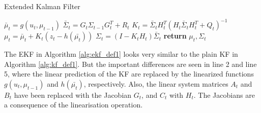 \begin{center}
\begin{minipage}{.65\linewidth}
\begin{algorithm}[H]
\caption{Extended Kalman Filter}
\label{alg:ekf_def1}
\begin{algorithmic}[1]
  \State $\bar\mu_{t} = g(u_t,\mu_{t-1})$
  \State $\bar\Sigma_{t} = G_{t}\Sigma_{t-1}G_{t}^T + R_{t}$
  \State $K_{t} = \bar\Sigma_{t}H_{t}^T(H_{t}\bar{\Sigma}_{t}H_{t}^T+Q_{t})^{-1}$
  \State $\mu_{t} = \bar\mu_{t} + K_{t}(z_{t} - h(\bar{\mu_t}))$
  \State $\Sigma_{t} = (I - K_{t}H_{t})\bar\Sigma_{t}$
  \State \textbf{return} $\mu_{t}, \Sigma_{t}$
\EndProcedure
\end{algorithmic}
\end{algorithm}
\end{minipage}
\end{center}

The EKF in Algorithm \ref{alg:ekf_def1} looks very similar to the plain KF in Algorithm \ref{alg:kf_def1}. But the important differences are seen in line 2 and line 5, where the linear prediction of the KF are replaced by the linearized functions $g(u_t,\mu_{t-1})$ and $h(\bar{\mu_t})$, respectively. Also, the linear system matrices $A_t$ and $B_t$ have been replaced with the Jacobian $G_t$, and $C_t$ with $H_t$. The Jacobians are a consequence of the linearisation operation.
